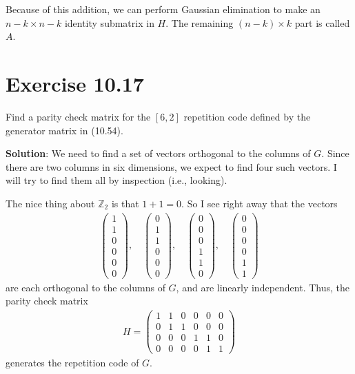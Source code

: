 \documentclass{book}
\begin{document}
    Because of this addition, we can perform Gaussian elimination to make an $n-k \times n-k$ identity submatrix in $H$. The remaining $(n-k)\times k$ part is called $A$. 

\section*{Exercise 10.17}
    Find a parity check matrix for the $[6,2]$ repetition code defined by the generator matrix in (10.54). 

    \textbf{Solution}: We need to find a set of vectors orthogonal to the columns of $G$. Since there are two columns in six dimensions, we expect to find four such vectors. I will try to find them all by inspection (i.e., looking). 

    The nice thing about $\mathbb{Z}_2$ is that $1 + 1 = 0$. So I see right away that the vectors
    \begin{align}
        \begin{pmatrix}
            1 \\ 1 \\ 0 \\ 0 \\ 0\\ 0
        \end{pmatrix}, \quad \begin{pmatrix} 0 \\ 1 \\ 1 \\ 0 \\ 0\\ 0
        \end{pmatrix}, \quad \begin{pmatrix} 0 \\ 0 \\ 0 \\ 1 \\ 1\\ 0
        \end{pmatrix}, \quad \begin{pmatrix} 0 \\ 0 \\ 0 \\ 0 \\ 1\\ 1
        \end{pmatrix}
    \end{align}
    are each orthogonal to the columns of $G$, and are linearly independent. Thus, the parity check matrix
    \begin{align}
        H = \begin{pmatrix}
                1 & 1 & 0 & 0 & 0 & 0\\
                0 & 1 & 1 & 0 & 0 & 0\\
                0 & 0 & 0 & 1 & 1 & 0\\
                0 & 0 & 0 & 0 & 1 & 1      
        \end{pmatrix}
    \end{align}
    generates the repetition code of $G$.
\end{document}

